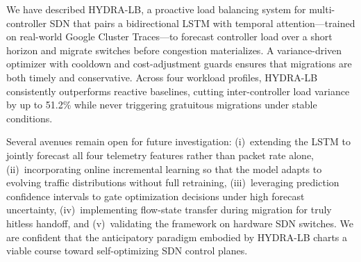 \documentclass[conference]{IEEEtran}
\begin{document}
We have described HYDRA-LB, a proactive load balancing system for multi-controller SDN that pairs a bidirectional LSTM with temporal attention---trained on real-world Google Cluster Traces---to forecast controller load over a short horizon and migrate switches before congestion materializes. A variance-driven optimizer with cooldown and cost-adjustment guards ensures that migrations are both timely and conservative. Across four workload profiles, HYDRA-LB consistently outperforms reactive baselines, cutting inter-controller load variance by up to 51.2\% while never triggering gratuitous migrations under stable conditions.

Several avenues remain open for future investigation: (i)~extending the LSTM to jointly forecast all four telemetry features rather than packet rate alone, (ii)~incorporating online incremental learning so that the model adapts to evolving traffic distributions without full retraining, (iii)~leveraging prediction confidence intervals to gate optimization decisions under high forecast uncertainty, (iv)~implementing flow-state transfer during migration for truly hitless handoff, and (v)~validating the framework on hardware SDN switches. We are confident that the anticipatory paradigm embodied by HYDRA-LB charts a viable course toward self-optimizing SDN control planes.



\end{document}
